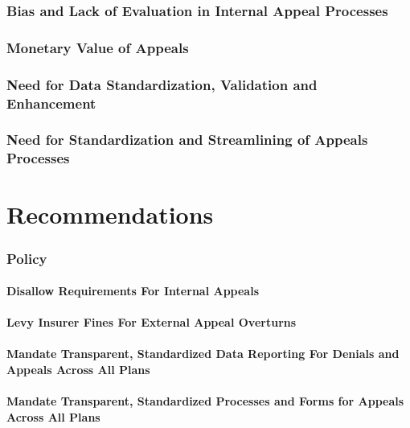 \documentclass[12pt, a4paper,twoside]{report}
\theoremstyle{plain} %
\theoremstyle{definition} %
\theoremstyle{remark} %
\numberwithin{equation}{chapter}
\begin{document}
		\subsection{Bias and Lack of Evaluation in Internal Appeal Processes}
		
		\subsection{Monetary Value of Appeals}
		
		\subsection{Need for Data Standardization, Validation and Enhancement}
		
		\subsection{Need for Standardization and Streamlining of Appeals Processes}
		
		\chapter{Recommendations}\label{recommendations}
		
		\subsection{Policy}
		
		\subsubsection{Disallow Requirements For Internal Appeals}
		
		\subsubsection{Levy Insurer Fines For External Appeal Overturns}
		
		\subsubsection{Mandate Transparent, Standardized Data Reporting For Denials and Appeals Across All Plans}
		
		\subsubsection{Mandate Transparent, Standardized Processes and Forms for Appeals Across All Plans}
		
\end{document}
